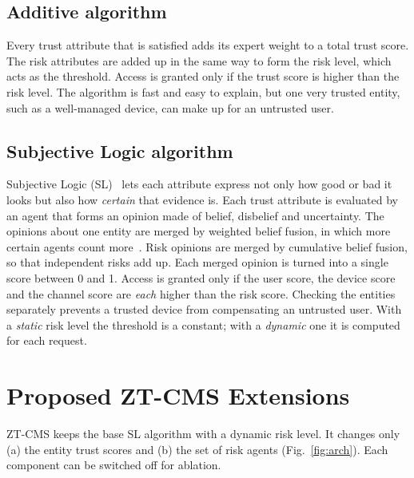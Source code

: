 \documentclass[conference,a4paper]{IEEEtran}
\begin{document}
\subsection{Additive algorithm}
Every trust attribute that is satisfied adds its expert weight to a total trust score. The risk attributes are added up in the same way to form the risk level, which acts as the threshold. Access is granted only if the trust score is higher than the risk level. The algorithm is fast and easy to explain, but one very trusted entity, such as a well-managed device, can make up for an untrusted user.

\subsection{Subjective Logic algorithm}
Subjective Logic (SL)~\cite{josang} lets each attribute express not only how good or bad it looks but also how \emph{certain} that evidence is. Each trust attribute is evaluated by an agent that forms an opinion made of belief, disbelief and uncertainty. The opinions about one entity are merged by weighted belief fusion, in which more certain agents count more~\cite{fusion}. Risk opinions are merged by cumulative belief fusion, so that independent risks add up. Each merged opinion is turned into a single score between 0 and 1. Access is granted only if the user score, the device score and the channel score are \emph{each} higher than the risk score. Checking the entities separately prevents a trusted device from compensating an untrusted user. With a \emph{static} risk level the threshold is a constant; with a \emph{dynamic} one it is computed for each request.

\section{Proposed ZT-CMS Extensions}\label{sec:method}
ZT-CMS keeps the base SL algorithm with a dynamic risk level. It changes only (a) the entity trust scores and (b) the set of risk agents (Fig.~\ref{fig:arch}). Each component can be switched off for ablation.
\end{document}
